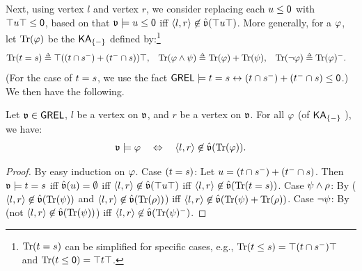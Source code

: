 Next, using  vertex $l$ and  vertex $r$, we consider replacing each  $\term[3] \le \emp$ with $\top \term[3] \top \le \emp$,
based on that $\val \models \term[3] \le \emp$ iff $\tuple{l, r} \not\in \hat{\val}(\top \term[3] \top)$.
More generally, for a  $\fml$,
let $\mathrm{Tr}(\fml)$ be the $\mathsf{KA}_{\{-\}}$  defined by:\footnote{$\mathrm{Tr}(\term[1] = \term[2])$ can be simplified for specific cases, e.g., $\mathrm{Tr}(\term[1] \le \term[2]) = \top (\term[1] \cap \term[2]^{-}) \top$ and $\mathrm{Tr}(\term[1] \le \emp) = \top \term[1] \top$.}
\begin{align*}
    \mathrm{Tr}(\term[1] = \term[2]) &\defeq \top ((\term[1] \cap \term[2]^{-}) \union (\term[1]^{-} \cap \term[2])) \top,&
    \mathrm{Tr}(\fml[1] \land \fml[2]) &\defeq \mathrm{Tr}(\fml[1]) \union \mathrm{Tr}(\fml[2]),&
    \mathrm{Tr}(\lnot \fml[1]) &\defeq \mathrm{Tr}(\fml[1])^{-}.
\end{align*}
(For the case of $\term[1] = \term[2]$, we use the fact $\GREL \models \term[1] = \term[2] \leftrightarrow (\term[1] \cap \term[2]^{-}) \union (\term[1]^{-} \cap \term[2]) \le \emp$.)
We then have the following.
\begin{lemma}\label{lemma: ORD lr top}
    Let $\mathfrak{v} \in \mathsf{GREL}$, $l$ be a  vertex on $\mathfrak{v}$, and $r$ be a  vertex on $\mathfrak{v}$.
    For all  $\fml$ (of $\mathsf{KA}_{\{-\}}$ ), we have:
    \[\val \models \fml \quad\Leftrightarrow\quad \tuple{l, r} \not\in \hat{\val}(\mathrm{Tr}(\fml)).\]
\end{lemma}
\begin{proof}
    By easy induction on $\fml$.
    Case $(\term[1] = \term[2])$:
    Let $\term[3] = (\term[1] \cap \term[2]^{-}) \union (\term[1]^{-} \cap \term[2])$.
    Then
    $\val \models \term[1] = \term[2]$ iff
    $\hat{\val}(\term[3]) =  \emptyset$ iff
    $\tuple{l, r} \not\in \hat{\val}(\top \term[3] \top)$ iff
    $\tuple{l, r} \not\in \hat{\val}(\mathrm{Tr}(\term[1] = \term[2]))$.
    Case $\fml[2] \land \fml[3]$:
    By ($\tuple{l, r} \not\in \hat{\val}(\mathrm{Tr}(\fml[2]))$ and $\tuple{l, r} \not\in \hat{\val}(\mathrm{Tr}(\fml[3]))$) iff $\tuple{l, r} \not\in \hat{\val}(\mathrm{Tr}(\fml[2]) \union \mathrm{Tr}(\fml[3]))$.
    Case $\lnot \fml[2]$:
    By (not $\tuple{l, r} \not\in \hat{\val}(\mathrm{Tr}(\fml[2]))$) iff $\tuple{l, r} \not\in \hat{\val}(\mathrm{Tr}(\fml[2])^{-})$.
\end{proof}

